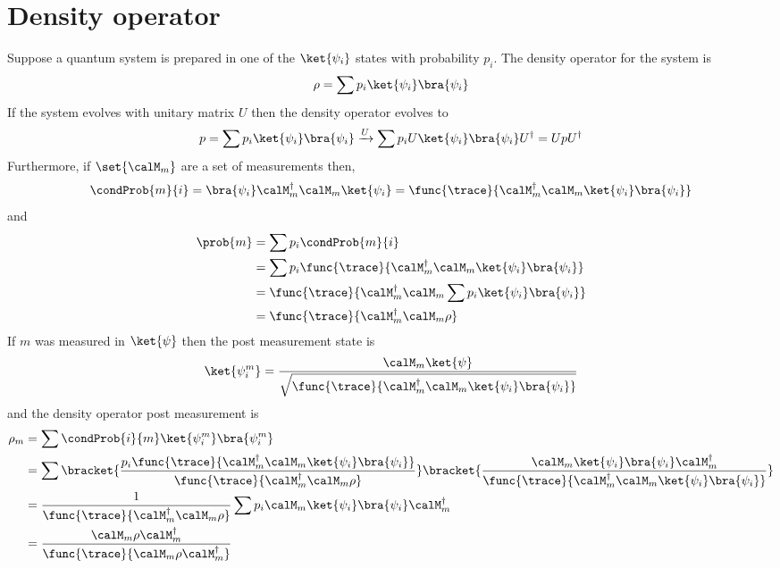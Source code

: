 \section{Density operator}
Suppose a quantum system is prepared in one of the \(\ket{\psi_i}\) states with probability \(p_i\). The density operator for the system is 
\begin{equation*}
    \rho = \sum p_i \ket{\psi_i} \bra{\psi_i}
\end{equation*}
If the system evolves with unitary matrix \(U\) then the density operator evolves to 
\begin{equation*}
    p = \sum p_i \ket{\psi_i} \bra{\psi_i} \xrightarrow{U} \sum p_i U\ket{\psi_i} \bra{\psi_i} U^{\dagger} = U p U^{\dagger}
\end{equation*}
Furthermore, if \(\set{\calM_m}\) are a set of measurements then,
\begin{equation*}
    \condProb{m}{i} = \bra{\psi_i} \calM_m^{\dagger} \calM_m \ket{\psi_i} = \func{\trace}{ \calM_m^{\dagger} \calM_m \ket{\psi_i} \bra{\psi_i}}
\end{equation*}
and 
\begin{align*}
    \prob{m} &= \sum p_i \condProb{m}{i}\\
    &= \sum p_i \func{\trace}{ \calM_m^{\dagger} \calM_m \ket{\psi_i} \bra{\psi_i}} \\
    &= \func{\trace}{ \calM_m^{\dagger} \calM_m \sum p_i \ket{\psi_i} \bra{\psi_i}} \\
    &= \func{\trace}{ \calM_m^{\dagger} \calM_m \rho}
\end{align*}
If \(m\) was measured in \(\ket{\psi}\) then the post measurement state is 
\begin{equation*}
    \ket{\psi_i^m} = \dfrac{\calM_m \ket{\psi}}{\sqrt{ \func{\trace}{ \calM_m^{\dagger} \calM_m \ket{\psi_i} \bra{\psi_i}}}}
\end{equation*}
and the density operator post measurement is 
\begin{align*}
    \rho_m &= \sum \condProb{i}{m} \ket{\psi_i^m} \bra{\psi_i^m}\\
    &= \sum \bracket{\dfrac{p_i \func{\trace}{ \calM_m^{\dagger} \calM_m \ket{\psi_i} \bra{\psi_i}}}{\func{\trace}{ \calM_m^{\dagger} \calM_m \rho}}} \bracket{\dfrac{\calM_m \ket{\psi_i} \bra{\psi_i} \calM_m^{\dagger}}{\func{\trace}{ \calM_m^{\dagger} \calM_m \ket{\psi_i} \bra{\psi_i}}}}\\
    &= \dfrac{1}{\func{\trace}{ \calM_m^{\dagger} \calM_m \rho}} \sum  p_i \calM_m \ket{\psi_i} \bra{\psi_i} \calM_m^{\dagger}\\
    &= \dfrac{\calM_m \rho \calM_m^{\dagger}}{\func{\trace}{  \calM_m \rho \calM_m^{\dagger}}}
\end{align*}

